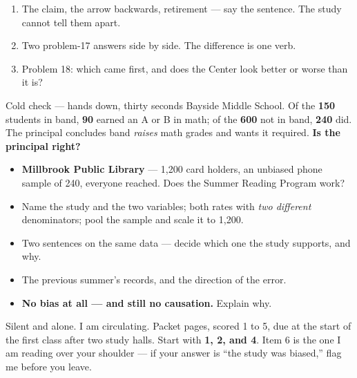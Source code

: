 \documentclass[aspectratio=169, 11pt]{beamer}
\begin{document}
\begin{frame}[t, plain]
  \vspace{4pt}
  \begin{enumerate}\setlength{\itemsep}{4pt}
    \item The claim, the arrow backwards, retirement --- say the sentence. The study cannot
          tell them apart.
    \item Two problem-17 answers side by side. The difference is one verb.
    \item Problem 18: which came first, and does the Center look better or worse than it is?
  \end{enumerate}
  \vspace{6pt}
  \begin{block}{Cold check --- hands down, thirty seconds}
    Bayside Middle School. Of the \textbf{150} students in band, \textbf{90} earned an A or B
    in math; of the \textbf{600} not in band, \textbf{240} did. The principal concludes band
    \emph{raises} math grades and wants it required. \textbf{Is the principal right?}
  \end{block}
\end{frame}

\begin{frame}[t, plain]
  \begin{itemize}\setlength{\itemsep}{4pt}
    \item \textbf{Millbrook Public Library} --- 1{,}200 card holders, an unbiased phone sample
          of 240, everyone reached. Does the Summer Reading Program work?
    \item Name the study and the two variables; both rates with \emph{two different}
          denominators; pool the sample and scale it to 1{,}200.
    \item Two sentences on the same data --- decide which one the study supports, and why.
    \item The previous summer's records, and the direction of the error.
    \item \textbf{No bias at all --- and still no causation.} Explain why.
  \end{itemize}
  \begin{block}{Silent and alone. I am circulating. Packet pages, scored 1 to 5, due at the start of the first class after two study halls.}
    Start with \textbf{1, 2, and 4}. Item 6 is the one I am reading over your shoulder --- if
    your answer is ``the study was biased,'' flag me before you leave.
  \end{block}
\end{frame}
\end{document}

